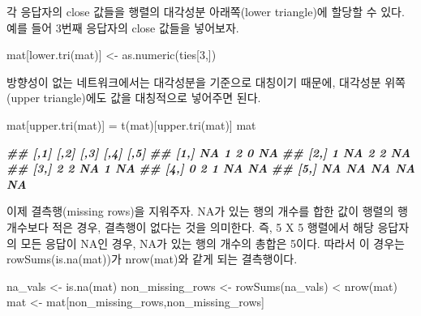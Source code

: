 \documentclass[
]{book}
\newenvironment{Shaded}{\begin{snugshade}}{\end{snugshade}}
\newcommand{\DecValTok}[1]{\textcolor[rgb]{0.00,0.00,0.81}{#1}}
\newcommand{\DocumentationTok}[1]{\textcolor[rgb]{0.56,0.35,0.01}{\textbf{\textit{#1}}}}
\newcommand{\FunctionTok}[1]{\textcolor[rgb]{0.00,0.00,0.00}{#1}}
\newcommand{\NormalTok}[1]{#1}
\newcommand{\OtherTok}[1]{\textcolor[rgb]{0.56,0.35,0.01}{#1}}
\newcommand{\SpecialCharTok}[1]{\textcolor[rgb]{0.00,0.00,0.00}{#1}}
\begin{document}
각 응답자의 close 값들을 행렬의 대각성분 아래쪽(lower triangle)에 할당할 수 있다.
예를 들어 3번째 응답자의 close 값들을 넣어보자.

\begin{Shaded}
\begin{Highlighting}[]
\NormalTok{mat[}\FunctionTok{lower.tri}\NormalTok{(mat)] }\OtherTok{\textless{}{-}} \FunctionTok{as.numeric}\NormalTok{(ties[}\DecValTok{3}\NormalTok{,])}
\end{Highlighting}
\end{Shaded}

방향성이 없는 네트워크에서는 대각성분을 기준으로 대칭이기 때문에, 대각성분 위쪽(upper triangle)에도 값을 대칭적으로 넣어주면 된다.

\begin{Shaded}
\begin{Highlighting}[]
\NormalTok{mat[}\FunctionTok{upper.tri}\NormalTok{(mat)] }\OtherTok{=} \FunctionTok{t}\NormalTok{(mat)[}\FunctionTok{upper.tri}\NormalTok{(mat)]}
\NormalTok{mat}
\end{Highlighting}
\end{Shaded}

\begin{Shaded}
\begin{Highlighting}[]
\DocumentationTok{\#\#      [,1] [,2] [,3] [,4] [,5]}
\DocumentationTok{\#\# [1,]   NA    1    2    0   NA}
\DocumentationTok{\#\# [2,]    1   NA    2    2   NA}
\DocumentationTok{\#\# [3,]    2    2   NA    1   NA}
\DocumentationTok{\#\# [4,]    0    2    1   NA   NA}
\DocumentationTok{\#\# [5,]   NA   NA   NA   NA   NA}
\end{Highlighting}
\end{Shaded}

이제 결측행(missing rows)을 지워주자.
NA가 있는 행의 개수를 합한 값이 행렬의 행 개수보다 적은 경우, 결측행이 없다는 것을 의미한다.
즉, 5 X 5 행렬에서 해당 응답자의 모든 응답이 NA인 경우, NA가 있는 행의 개수의 총합은 5이다.
따라서 이 경우는 rowSums(is.na(mat))가 nrow(mat)와 같게 되는 결측행이다.

\begin{Shaded}
\begin{Highlighting}[]
\NormalTok{na\_vals }\OtherTok{\textless{}{-}} \FunctionTok{is.na}\NormalTok{(mat)}
\NormalTok{non\_missing\_rows }\OtherTok{\textless{}{-}} \FunctionTok{rowSums}\NormalTok{(na\_vals) }\SpecialCharTok{\textless{}} \FunctionTok{nrow}\NormalTok{(mat)}
\NormalTok{mat }\OtherTok{\textless{}{-}}\NormalTok{ mat[non\_missing\_rows,non\_missing\_rows]}
\end{Highlighting}
\end{Shaded}
\end{document}
